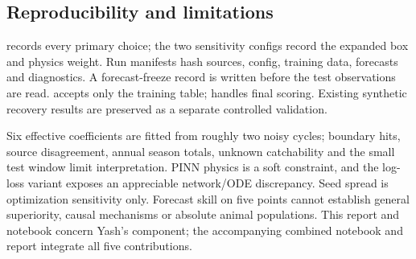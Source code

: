 \subsection{Reproducibility and limitations}
 records every primary choice; the two sensitivity
configs record the expanded box and physics weight. Run manifests hash sources, config,
training data, forecasts and diagnostics. A forecast-freeze record is written before the
test observations are read.  accepts only the
training table;  handles final scoring. Existing
synthetic recovery results are preserved as a separate controlled validation.

Six effective coefficients are fitted from roughly two noisy cycles; boundary hits,
source disagreement, annual season totals, unknown catchability and the small test window
limit interpretation. PINN physics is a soft constraint, and the log-loss variant exposes
an appreciable network/ODE discrepancy. Seed spread is optimization sensitivity only.
Forecast skill on five points cannot establish general superiority, causal mechanisms
or absolute animal populations. This report and notebook concern Yash's component; the accompanying combined notebook and report integrate all five contributions.
